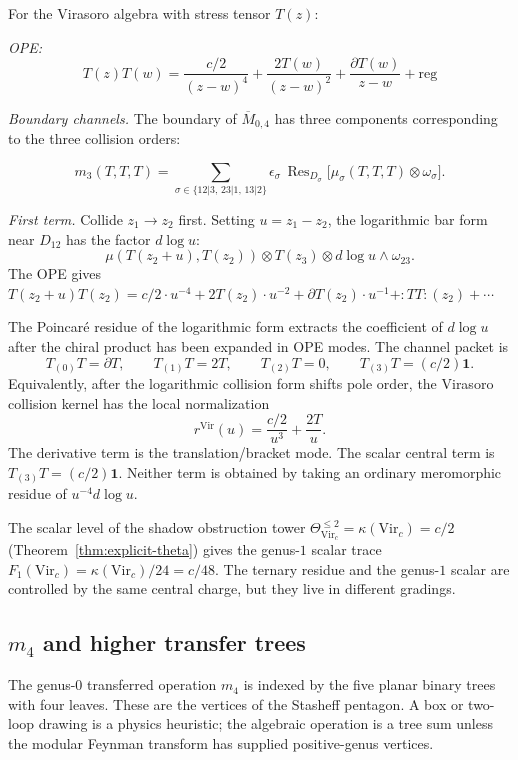 \begin{computation}
\label{comp:v1-virasoro-m3}
For the Virasoro algebra with stress tensor $T(z)$:

\emph{OPE:}
\[T(z)T(w) = \frac{c/2}{(z-w)^4} + \frac{2T(w)}{(z-w)^2} + \frac{\partial T(w)}{z-w}
+ \text{reg}\]

\emph{Boundary channels.}
The boundary of $\overline{M}_{0,4}$ has three components
corresponding to the three collision orders:

\[
m_3(T,T,T)=
\sum_{\sigma\in\{12|3,\,23|1,\,13|2\}}
\epsilon_\sigma\,\operatorname{Res}_{D_\sigma}
\bigl[\mu_\sigma(T,T,T)\otimes\omega_\sigma\bigr].
\]

\emph{First term.}
Collide $z_1 \to z_2$ first. Setting $u = z_1 - z_2$, the logarithmic
bar form near $D_{12}$ has the factor $d\log u$:
\[
\mu(T(z_2+u),T(z_2))\otimes T(z_3)\otimes d\log u\wedge\omega_{23}.
\]
The OPE gives $T(z_2+u)T(z_2) = c/2 \cdot u^{-4} + 2T(z_2) \cdot u^{-2} + \partial T(z_2) \cdot u^{-1} + {:}TT{:}(z_2) + \cdots$

The Poincar\'e residue of the logarithmic form extracts the coefficient
of $d\log u$ after the chiral product has been expanded in OPE modes.
The channel packet is
\[
T_{(0)}T=\partial T,\qquad
T_{(1)}T=2T,\qquad
T_{(2)}T=0,\qquad
T_{(3)}T=(c/2)\mathbf{1}.
\]
Equivalently, after the logarithmic collision form shifts pole order,
the Virasoro collision kernel has the local normalization
\[
r^{\mathrm{Vir}}(u)=\frac{c/2}{u^3}+\frac{2T}{u}.
\]
The derivative term is the translation/bracket mode.  The scalar
central term is $T_{(3)}T=(c/2)\mathbf{1}$.  Neither term is obtained
by taking an ordinary meromorphic residue of $u^{-4}d\log u$.

The scalar level of the shadow obstruction tower
$\Theta_{\mathrm{Vir}_c}^{\leq 2} = \kappa(\mathrm{Vir}_c) = c/2$
(Theorem~\ref{thm:explicit-theta}) gives the genus-$1$ scalar trace
$F_1(\mathrm{Vir}_c)=\kappa(\mathrm{Vir}_c)/24=c/48$.  The ternary
residue and the genus-$1$ scalar are controlled by the same central
charge, but they live in different gradings.
\end{computation}

\subsection{\texorpdfstring{$m_4$ and higher transfer trees}{m 4 and higher transfer trees}}

\begin{example}
\label{ex:m4-two-loop}
The genus-$0$ transferred operation $m_4$ is indexed by the five planar
binary trees with four leaves.  These are the vertices of the
Stasheff pentagon.  A box or two-loop drawing is a physics heuristic;
the algebraic operation is a tree sum unless the modular Feynman
transform has supplied positive-genus vertices.
\end{example}

